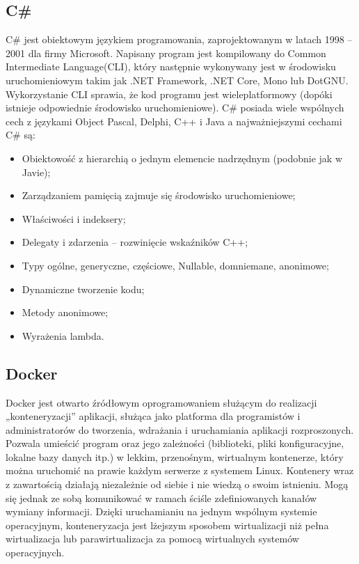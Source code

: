 \documentclass[12pt,a4paper]{article}
\begin{document}
		\subsection{C\#}
			\indent C\# jest obiektowym językiem programowania, zaprojektowanym w latach 1998 – 2001 dla firmy Microsoft.
			Napisany program jest kompilowany do Common Intermediate Language(CLI), który następnie wykonywany jest w środowisku uruchomieniowym takim jak .NET Framework,
			.NET Core, Mono lub DotGNU.
			Wykorzystanie CLI sprawia, że kod programu jest wieleplatformowy (dopóki istnieje odpowiednie środowisko uruchomieniowe).
			C\# posiada wiele wspólnych cech z językami Object Pascal, Delphi, C++ i Java a najważniejszymi cechami C\# są:
			\begin{itemize}
				\item Obiektowość z hierarchią o jednym elemencie nadrzędnym (podobnie jak w Javie);
				\item Zarządzaniem pamięcią zajmuje się środowisko uruchomieniowe;
				\item Właściwości i indeksery;
				\item Delegaty i zdarzenia – rozwinięcie wskaźników C++;
				\item Typy ogólne, generyczne, częściowe, Nullable, domniemane, anonimowe;
				\item Dynamiczne tworzenie kodu;
				\item Metody anonimowe;
				\item Wyrażenia lambda.
			\end{itemize}
		
		\subsection{Docker}
			\indent Docker jest otwarto źródłowym oprogramowaniem służącym do realizacji „konteneryzacji” aplikacji, służąca jako platforma dla programistów
				i administratorów do tworzenia, wdrażania i uruchamiania aplikacji rozproszonych. Pozwala umieścić program oraz jego zależności (biblioteki,
				pliki konfiguracyjne, lokalne bazy danych itp.) w lekkim, przenośnym, wirtualnym kontenerze, który można uruchomić na prawie każdym serwerze
				z systemem Linux. Kontenery wraz z zawartością działają niezależnie od siebie i nie wiedzą o swoim istnieniu. Mogą się jednak ze sobą
				komunikować w ramach ściśle zdefiniowanych kanałów wymiany informacji. Dzięki uruchamianiu na jednym wspólnym systemie operacyjnym,
				konteneryzacja jest lżejszym sposobem wirtualizacji niż pełna wirtualizacja lub parawirtualizacja za pomocą wirtualnych systemów
				operacyjnych.
				 	
\end{document}

